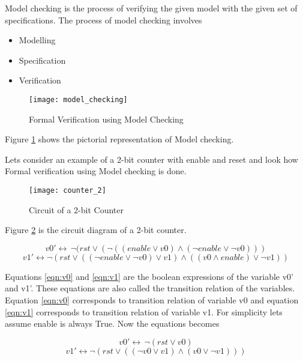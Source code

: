 Model checking is the process of verifying the given model with the given set of specifications. The process of model checking involves
\begin{itemize}
\item Modelling
\item Specification
\item Verification
\end{itemize}

\begin{figure}[h]
\texttt{[image: model\_checking]}
\caption{Formal Verification using Model Checking}
\label{fig:sample_model_checking}
\end{figure}

Figure \ref{fig:sample_model_checking} shows the pictorial representation of Model checking.

Lets consider an example of a 2-bit counter with enable and reset and look how Formal verification using Model checking is done.\newline

\begin{figure}
\texttt{[image: counter\_2]}
\caption{Circuit of a 2-bit Counter}
\label{fig:2-bit Counter}
\end{figure}

Figure \ref{fig:2-bit Counter} is the circuit diagram of a 2-bit counter.

\begin{equation}
v0'\leftrightarrow\,\neg (rst\lor(\neg((enable\lor v0)\land(\neg enable\lor\neg v0)))
\label{eqn:v0}
\end{equation}
\begin{equation}
v1'\leftrightarrow \neg (rst\lor ((\neg enable\lor\neg v0)\lor v1)\land((v0\land enable)\lor \neg v1))
\label{eqn:v1}
\end{equation}

Equations \ref{eqn:v0} and \ref{eqn:v1} are the boolean expressions of the variable v0' and v1'. These equations are also called the transition relation of the variables. Equation \ref{eqn:v0} corresponds to transition relation of variable v0 and equation \ref{eqn:v1} corresponds to transition relation of variable v1. For simplicity lets assume enable is always True. Now the equations becomes

\begin{equation}
v0'\leftrightarrow\,\neg (rst\lor v0)
\label{eqn:v0_1}
\end{equation}
\begin{equation}
v1'\leftrightarrow \neg (rst\lor ((\neg v0 \lor v1)\land(v0 \lor \neg v1)))
\label{eqn:v1_1}
\end{equation}

